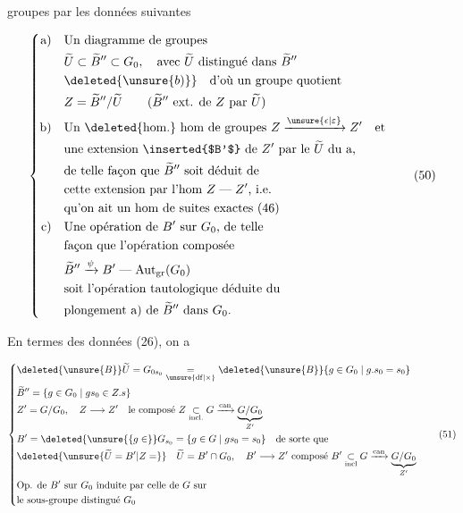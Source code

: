 
groupes par les données suivantes

\[
\left\{\begin{aligned}
\text{a)}\quad&\text{Un diagramme de groupes}\\
 &\widetilde U\subset\widetilde B''\subset G_0,\quad\text{avec $\widetilde U$ distingué dans $\widetilde B''$}\\
 &\deleted{\unsure{b)}}\quad\text{d'où un groupe quotient}\\
 &Z=\widetilde B''/\widetilde U\qquad(\widetilde B''\text{ ext. de $Z$ par $\widetilde U$})\\
\text{b)}\quad&\text{Un \deleted{hom.} hom de groupes }Z\xrightarrow{\unsure{\epsilon|\varepsilon}}Z'\quad\text{et}\\
 &\text{une extension \inserted{$B'$} de $Z'$ par le $\widetilde U$ du a,}\\
 &\text{de telle façon que $\widetilde B''$ soit déduit de}\\
 &\text{cette extension par l'hom $Z\mathrel{\text{---}}Z'$, i.e.}\\
 &\text{qu'on ait un hom de suites exactes (46)}\\
\text{c)}\quad&\text{Une opération de $B'$ sur $G_0$, de telle}\\
 &\text{façon que l'opération composée}\\
 &\widetilde B''\xrightarrow{\psi}B'\mathrel{\text{---}}\operatorname{Aut}_{\rm gr}(G_0)\\
 &\text{soit l'opération tautologique déduite du}\\
 &\text{plongement a) de $\widetilde B''$ dans $G_0$.}
\end{aligned}\right.\tag*{(50)}
\]


En termes des données (26), on a

\[
\left\{\begin{aligned}
 &\deleted{\unsure{B}}\widetilde U=G_{0s_0}\underset{\unsure{\mathrm{df}|\times}}{=}\deleted{\unsure{B}}\{g\in G_0\mid g.s_0=s_0\}\\
 &\widetilde B''=\{g\in G_0\mid gs_0\in Z.s\}\\
 &Z'=G/G_0,\quad Z\longrightarrow Z'\quad\text{le composé }Z\underset{\rm incl.}{\subset}G\xrightarrow{\rm can}\underbrace{G/G_0}_{Z'}\\
 &B'=\deleted{\unsure{\{g\in}}G_{s_0}=\{g\in G\mid gs_0=s_0\}\quad\text{de sorte que}\\
 &\deleted{\unsure{\widetilde U=B'|Z=}}\quad\widetilde U=B'\cap G_0,\quad B'\longrightarrow Z'\ \text{composé }B'\underset{\rm incl}{\subset}G\xrightarrow{\rm can}\underbrace{G/G_0}_{Z'}\\
 &\text{Op. de $B'$ sur $G_0$ induite par celle de $G$ sur}\\
 &\text{le sous-groupe distingué $G_0$}
\end{aligned}\right.\tag*{(51)}
\]

